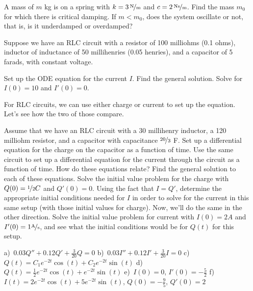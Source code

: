 \begin{exercise}\ansMark%
A mass of $m$ \unit{kg} is on a spring with $k=\unitfrac[3]{N}{m}$ and
$c=\unitfrac[2]{Ns}{m}$.  Find the mass $m_0$ for which there is critical
damping.  If $m < m_0$, does the system oscillate or not, that is, is it
underdamped or overdamped?
\end{exercise}

\begin{exercise}\ansMark%
Suppose we have an RLC circuit with a resistor of 100 milliohms (0.1 ohms),
inductor of inductance of 50 millihenries (0.05 henries), and a capacitor of 5 farads, with
constant voltage.
\begin{tasks}
\task Set up the ODE equation for the current $I$.
\task Find the general solution.
\task Solve for $I(0) = 10$ and $I'(0) = 0$.
\end{tasks}
\end{exercise}

\begin{exercise}
For RLC circuits, we can use either charge or current to set up the equation. Let's see how the two of those compare.
\begin{tasks}
\task Assume that we have an RLC circuit with a 30 millihenry inductor, a 120 milliohm resistor, and a capacitor with capacitance $\nicefrac{20}{3}$ F. Set up a differential equation for the charge on the capacitor as a function of time.
\task Use the same circuit to set up a differential equation for the current through the circuit as a function of time. How do these equations relate?
\task Find the general solution to each of these equations. 
\task Solve the initial value problem for the charge with $Q(0) = \nicefrac{1}{2} C$ and $Q'(0) = 0$.
\task Using the fact that $I = Q'$, determine the appropriate initial conditions needed for $I$ in order to solve for the current in this same setup (with those initial values for charge).
\task Now, we'll do the same in the other direction. Solve the initial value problem for current with $I(0) = 2 A$ and $I'(0) = 1 \unitfrac{A}{s}$, and see what the initial conditions would be for $Q(t)$ for this setup.    
\end{tasks}
\end{exercise}
\comboSol{%
}
{%
a)~$0.03Q'' + 0.12Q' + \frac{3}{20}Q = 0$ \quad
b)~$0.03I'' + 0.12I' + \frac{3}{20}I = 0$ \quad
c)~$Q(t) = C_1e^{-2t}\cos(t) + C_2e^{-2t}\sin(t)$ \quad
d)~$Q(t) = \frac{1}{2}e^{-2t}\cos(t) + e^{-2t}\sin(t)$ \quad
e)~$I(0) = 0$, $I'(0) = -\frac{5}{2}$ \quad
f)~$I(t) = 2e^{-2t}\cos(t) + 5e^{-2t}\sin(t)$, $Q(0) = -\frac{9}{5}$, $Q'(0) = 2$
}

